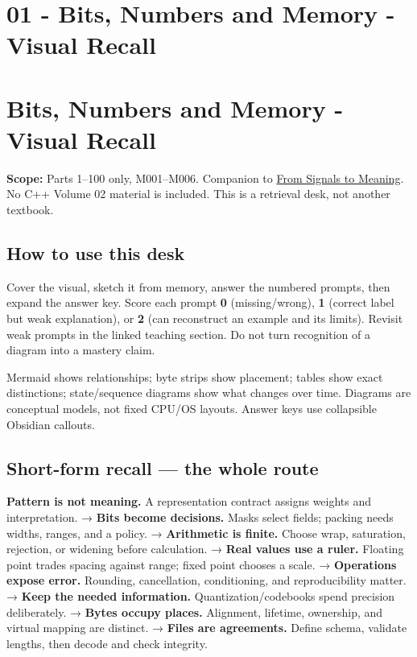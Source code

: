 \hypertarget{appendix-ef4d27797a92}{}
\section*{01 - Bits, Numbers and Memory - Visual Recall}
\section{Bits, Numbers and Memory - Visual Recall}\label{bits-numbers-and-memory---visual-recall}

\textbf{Scope:} Parts 1--100 only, M001--M006. Companion to \href{Continuous\%20Notes/Computing\%20Foundations\%20-\%20From\%20Bits\%20to\%20C++\%20and\%20Systems\%20APIs}{From Signals to Meaning}. No C++ Volume 02 material is included. This is a retrieval desk, not another textbook.

\subsection{How to use this desk}\label{how-to-use-this-desk}

Cover the visual, sketch it from memory, answer the numbered prompts, then expand the answer key. Score each prompt \textbf{0} (missing/wrong), \textbf{1} (correct label but weak explanation), or \textbf{2} (can reconstruct an example and its limits). Revisit weak prompts in the linked teaching section. Do not turn recognition of a diagram into a mastery claim.

Mermaid shows relationships; byte strips show placement; tables show exact distinctions; state/sequence diagrams show what changes over time. Diagrams are conceptual models, not fixed CPU/OS layouts. Answer keys use collapsible Obsidian callouts.

\subsection{Short-form recall --- the whole route}\label{short-form-recall-the-whole-route}

\textbf{Pattern is not meaning.} A representation contract assigns weights and interpretation. → \textbf{Bits become decisions.} Masks select fields; packing needs widths, ranges, and a policy. → \textbf{Arithmetic is finite.} Choose wrap, saturation, rejection, or widening before calculation. → \textbf{Real values use a ruler.} Floating point trades spacing against range; fixed point chooses a scale. → \textbf{Operations expose error.} Rounding, cancellation, conditioning, and reproducibility matter. → \textbf{Keep the needed information.} Quantization/codebooks spend precision deliberately. → \textbf{Bytes occupy places.} Alignment, lifetime, ownership, and virtual mapping are distinct. → \textbf{Files are agreements.} Define schema, validate lengths, then decode and check integrity.

